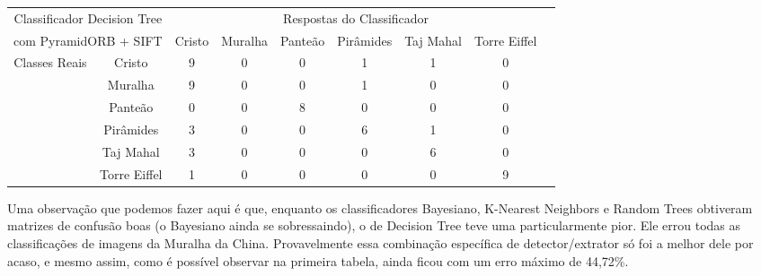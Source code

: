 \documentclass[a4paper,11pt]{article}
\begin{document}
  \hspace{-75pt}
  \begin{tabular}{|cc|c|c|c|c|c|c|c|}
    \hline
    \multicolumn{2}{|c|}{Classificador Decision Tree} &
    \multicolumn{6}{|c|}{Respostas do Classificador} \\
    \cline{3-8}
    \multicolumn{2}{|c|}{com PyramidORB + SIFT}
    & Cristo & Muralha & Panteão & Pirâmides & Taj Mahal & Torre Eiffel \\
    \hline
    \multirow{6}{*}{Classes Reais}
    & \multicolumn{1}{|c|}{Cristo} & 9 & 0 & 0 & 1 & 1 & 0 \\
    \cline{2-8}
    & \multicolumn{1}{|c|}{Muralha} & 9 & 0 & 0 & 1 & 0 & 0\\
    \cline{2-8}
    & \multicolumn{1}{|c|}{Panteão} & 0 & 0 & 8 & 0 & 0 & 0\\
    \cline{2-8}
    & \multicolumn{1}{|c|}{Pirâmides} & 3 & 0 & 0 & 6 & 1 & 0\\
    \cline{2-8}
    & \multicolumn{1}{|c|}{Taj Mahal} & 3 & 0 & 0 & 0 & 6 & 0\\
    \cline{2-8}
    & \multicolumn{1}{|c|}{Torre Eiffel} & 1 & 0 & 0 & 0 & 0 & 9\\
    \hline
  \end{tabular}
  \vspace{15pt}

  Uma observação que podemos fazer aqui é que, enquanto os classificadores
  Bayesiano, K-Nearest Neighbors e Random Trees obtiveram matrizes de confusão
  boas (o Bayesiano ainda se sobressaindo), o de Decision Tree teve uma
  particularmente pior. Ele errou todas as classificações de imagens da Muralha
  da China. Provavelmente essa combinação específica de detector/extrator só foi
  a melhor dele por acaso, e mesmo assim, como é possível observar na primeira
  tabela, ainda ficou com um erro máximo de 44,72\%.
\end{document}
